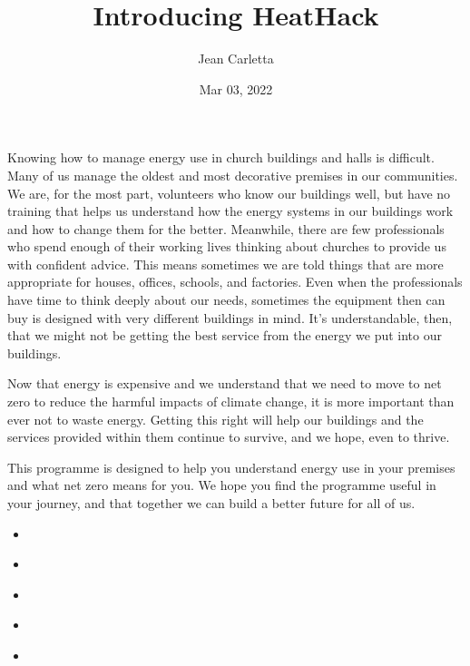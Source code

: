 \documentclass[letterpaper,10pt,english]{jupyterBook}
\title{Introducing HeatHack}
\date{Mar 03, 2022}
\author{Jean Carletta}
\begin{document}
\pagestyle{empty}
\sphinxmaketitle
\pagestyle{plain}
\sphinxtableofcontents
\pagestyle{normal}
\label{\detokenize{intro::doc}}


\sphinxAtStartPar
Knowing how to manage energy use in church buildings and halls is difficult.  Many of us manage the oldest and most decorative premises in our communities.  We are, for the most part, volunteers who know our buildings well, but have no training that helps us understand how the energy systems in our buildings work and how to change them for the better.  Meanwhile, there are few professionals who spend enough of their working lives thinking about churches to provide us with confident advice.  This means sometimes we are told things that are more appropriate for houses, offices, schools, and factories.  Even when the professionals have time to think deeply about our needs, sometimes the equipment then can buy is designed with very different buildings in mind.  It’s understandable, then, that we might not be getting the best service from the energy we put into our buildings.

\sphinxAtStartPar
Now that energy is expensive and we understand that we need to move to net zero to reduce the harmful impacts of climate change, it is more important than ever not to waste energy.  Getting this right will help our buildings and the services provided within them continue to survive, and we hope, even to thrive.

\sphinxAtStartPar
This programme is designed to help you understand energy use in your premises and what net zero means for you.  We hope you find the programme useful in your journey, and that together we can build a better future for all of us.
\begin{itemize}
\item {} 
\sphinxAtStartPar
{\hyperref[\detokenize{dedication::doc}]{}}

\item {} 
\sphinxAtStartPar
{\hyperref[\detokenize{motivation::doc}]{}}

\item {} 
\sphinxAtStartPar
{\hyperref[\detokenize{learning::doc}]{}}

\item {} 
\sphinxAtStartPar
{\hyperref[\detokenize{why-engineering::doc}]{}}

\item {} 
\sphinxAtStartPar
{\hyperref[\detokenize{about::doc}]{}}

\end{itemize}
\end{document}
